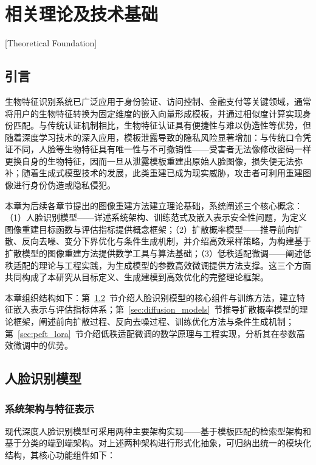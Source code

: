 \chapter{相关理论及技术基础}[Theoretical Foundation]\label{chap:theory}
\section{引言}\label{sec:theory_intro}

生物特征识别系统已广泛应用于身份验证、访问控制、金融支付等关键领域，通常将用户的生物特征转换为固定维度的嵌入向量形成模板，并通过相似度计算实现身份匹配。与传统认证机制相比，生物特征认证具有便捷性与难以伪造性等优势，但随着深度学习技术的深入应用，模板泄露导致的隐私风险显著增加：与传统口令凭证不同，人脸等生物特征具有唯一性与不可撤销性——受害者无法像修改密码一样更换自身的生物特征，因而一旦从泄露模板重建出原始人脸图像，损失便无法弥补；随着生成式模型技术的发展，此类重建已成为现实威胁，攻击者可利用重建图像进行身份伪造或隐私侵犯。

本章为后续各章节提出的图像重建方法建立理论基础，系统阐述三个核心概念：（1）人脸识别模型——详述系统架构、训练范式及嵌入表示安全性问题，为定义图像重建目标函数与评估指标提供概念框架；（2）扩散概率模型——推导前向扩散、反向去噪、变分下界优化与条件生成机制，并介绍高效采样策略，为构建基于扩散模型的图像重建方法提供数学工具与算法基础；（3）低秩适配微调——阐述低秩适配的理论与工程实践，为生成模型的参数高效微调提供方法支撑。这三个方面共同构成了本研究从目标定义、生成建模到高效优化的完整理论框架。

本章组织结构如下：第~\ref{sec:face_recognition}~节介绍人脸识别模型的核心组件与训练方法，建立特征嵌入表示与评估指标体系；第~\ref{sec:diffusion_models}~节推导扩散概率模型的理论框架，阐述前向扩散过程、反向去噪过程、训练优化方法与条件生成机制；第~\ref{sec:peft_lora}~节介绍低秩适配微调的数学原理与工程实现，分析其在参数高效微调中的优势。

\section{人脸识别模型}\label{sec:face_recognition}

\subsection{系统架构与特征表示}

现代深度人脸识别模型\cite{he2016deep,kingma2014adam}可采用两种主要架构实现——基于模板匹配的检索型架构和基于分类的端到端架构。对上述两种架构进行形式化抽象，可归纳出统一的模块化结构，其核心功能组件如下：

